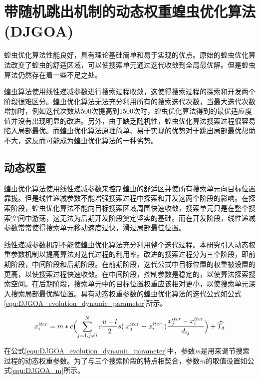 \section{带随机跳出机制的动态权重蝗虫优化算法(DJGOA)}
\label{sec:task_scheduling_DJGOA}

蝗虫优化算法性能良好，具有理论基础简单和易于实现的优点。原始的蝗虫优化算法改变了蝗虫的舒适区域，可以使搜索单元通过迭代收敛到全局最优解。但是蝗虫算法仍然存在着一些不足之处。

蝗虫算法使用线性递减参数进行搜索过程收敛，这使得搜索过程的探索和开发两个阶段很难区分。蝗虫优化算法无法充分利用所有的搜索迭代次数，当最大迭代次数增加时，例如迭代次数从500次提高到1500次时，蝗虫优化算法得到的最优适应度值并没有出现明显的改进。另外，由于缺乏随机性，蝗虫优化算法搜索过程很容易陷入局部最优。而蝗虫优化算法原理简单、易于实现的优势对于跳出局部最优帮助不大，这反而可能成为蝗虫优化算法的一种劣势。

\subsection{动态权重}

蝗虫优化算法使用线性递减参数来控制蝗虫的舒适区并使所有搜索单元向目标位置靠拢。但是线性递减参数不能增强搜索过程中探索和开发这两个阶段的影响。在探索阶段，蝗虫优化算法不能向目标搜索区域周围快速收敛，搜索单元只是在整个搜索空间中游荡，这无法为后期开发阶段奠定坚实的基础。而在开发阶段，线性递减参数常常使得搜索单元移动速度过快，滑过局部最佳位置。

线性递减参数机制不能使蝗虫优化算法充分利用整个迭代过程。本研究引入动态权重参数机制以提高算法对迭代过程的利用率。改进的搜索过程分为三个阶段，即前期阶段，中间阶段和后期阶段。在前期阶段，迭代公式中目标位置的权重被设置的更高，以使搜索过程快速收敛。在中间阶段，控制参数是稳定的，以使算法探索搜索空间。在后期阶段，搜索单元中的目标位置权重应该相对更小，以使搜索单元深入搜索局部最优解位置。具有动态权重参数的蝗虫优化算法的迭代公式如公式\ref{equ:DJGOA_evolution_dynamic_parameter}所示。

\begin{equation}\label{equ:DJGOA_evolution_dynamic_parameter}
    x^{iter}_i = m*c \Bigl(\sum_{j=1,j\neq{i}}^N c \frac{u-l}{2}s (\lvert x^{iter}_j-x^{iter}_i \rvert )\frac{x^{iter}_j-x^{iter}_i}{d_{ij}} \Bigr) + \widehat{T_d}
\end{equation}

在公式\ref{equ:DJGOA_evolution_dynamic_parameter}中，参数\emph{m}是用来调节搜索过程的动态权重参数。为了与三个搜索阶段的特点相契合，参数\emph{m}的取值设置如公式\ref{equ:DJGOA_m}所示。

